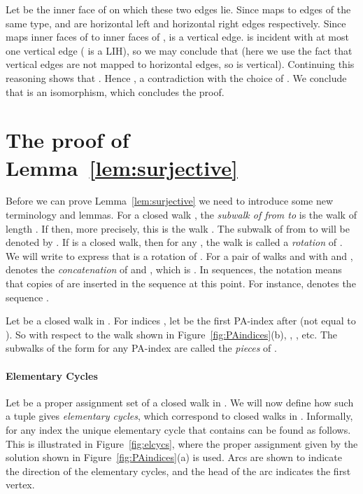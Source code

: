 \documentclass{llncs}
\newcommand{\QED}{\hspace*{\fill}{}\medskip}
\def\notat#1{{}\marginpar{\raggedright{\small }}}
\def\term#1{{\em #1}\marginpar{\raggedright{\small\it #1}}}
\begin{document}
Let  be the inner face of  on which these two edges lie. Since  maps to edges of the same type,  and  are horizontal left and horizontal right edges respectively.
Since  maps inner faces of  to inner faces of ,  is a vertical edge.  is incident with at most one vertical edge ( is a LIH), so we may conclude that  (here we use the fact that vertical edges are not mapped to horizontal edges, so  is vertical). Continuing this reasoning shows that . Hence , a contradiction with the choice of . We conclude that  is an isomorphism, which concludes the proof.\QED



\section{The proof of Lemma~\ref{lem:surjective}}
\label{sec:surjective}

Before we can prove Lemma~\ref{lem:surjective} we need to introduce some new terminology and lemmas.
For a closed walk , the {\em subwalk of  from  to } is the walk  of length . 
If  then, more precisely, this is the walk .
The subwalk of  from  to  will be denoted by \notat{W_{i,j}}.
If  is a closed walk, then for any , the walk  is called a \term{rotation} of . We will write \notat{W'\approx W} to express that  is a rotation of .
For a pair of walks  and  with  and , \notat{W\circ W'} denotes the \term{concatenation} of  and , which is .
In sequences, the notation \notat{(a)^b} means that  copies of  are inserted in the sequence at this point. For instance,  denotes the sequence .


Let  be a closed walk in .
For indices , let \notat{n(i)} be the first PA-index after  (not equal to ). So with respect to the walk  shown in Figure~\ref{fig:PAindices}(b), , , etc.
The subwalks of the form  for any PA-index  are called the \term{pieces} of .


\paragraph{Elementary Cycles}
Let  be a proper assignment set of a closed walk  in . 
We will now define how such a tuple  gives {\em elementary cycles}, which correspond to closed walks in . Informally, for any index  the unique elementary cycle that contains  can be found as follows. This is illustrated in Figure~\ref{fig:elcycs}, where the proper assignment given by the solution shown in Figure~\ref{fig:PAindices}(a) is used. Arcs are shown to indicate the direction of the elementary cycles, and the head of the arc indicates the first vertex.
 
\end{document}
